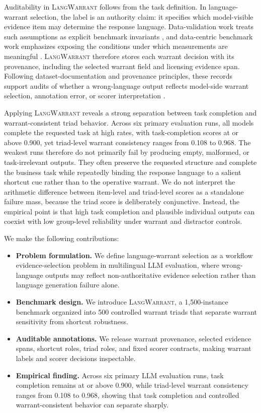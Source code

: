 \documentclass[10pt,conference]{IEEEtran}
\newcommand{\dataset}{\textsc{LangWarrant}}
\begin{document}
Auditability in \dataset{} follows from the task definition. In language-warrant selection, the label is an authority claim: it specifies which model-visible evidence item may determine the response language. Data-validation work treats such assumptions as explicit benchmark invariants \cite{breck2019datavalidation}, and data-centric benchmark work emphasizes exposing the conditions under which measurements are meaningful \cite{mazumder2023dataperf}. \dataset{} therefore stores each warrant decision with its provenance, including the selected warrant field and licensing evidence span. Following dataset-documentation and provenance principles, these records support audits of whether a wrong-language output reflects model-side warrant selection, annotation error, or scorer interpretation \cite{gebru2021datasheets,herschel2017provenance}.

Applying \dataset{} reveals a strong separation between task completion and warrant-consistent triad behavior. Across six primary evaluation runs, all models complete the requested task at high rates, with task-completion scores at or above 0.900, yet triad-level warrant consistency ranges from 0.108 to 0.968. The weakest runs therefore do not primarily fail by producing empty, malformed, or task-irrelevant outputs. They often preserve the requested structure and complete the business task while repeatedly binding the response language to a salient shortcut cue rather than to the operative warrant. We do not interpret the arithmetic difference between item-level and triad-level scores as a standalone failure mass, because the triad score is deliberately conjunctive. Instead, the empirical point is that high task completion and plausible individual outputs can coexist with low group-level reliability under warrant and distractor controls.

We make the following contributions:
\begin{itemize}
\item \textbf{Problem formulation.} We define language-warrant selection as a workflow evidence-selection problem in multilingual LLM evaluation, where wrong-language outputs may reflect non-authoritative evidence selection rather than language generation failure alone.
\item \textbf{Benchmark design.} We introduce \dataset{}, a 1,500-instance benchmark organized into 500 controlled warrant triads that separate warrant sensitivity from shortcut robustness.
\item \textbf{Auditable annotations.} We release warrant provenance, selected evidence spans, shortcut roles, triad roles, and fixed scorer contracts, making warrant labels and scorer decisions inspectable.
\item \textbf{Empirical finding.} Across six primary LLM evaluation runs, task completion remains at or above 0.900, while triad-level warrant consistency ranges from 0.108 to 0.968, showing that task completion and controlled warrant-consistent behavior can separate sharply.
\end{itemize}
\end{document}
